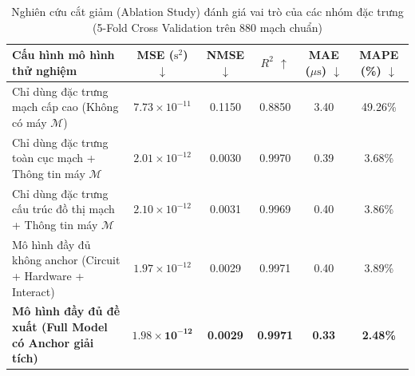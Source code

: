 \documentclass[11pt, a4paper]{article}
\begin{document}
\begin{table}[htbp]
\centering
\caption{Nghiên cứu cắt giảm (Ablation Study) đánh giá vai trò của các nhóm đặc trưng (5-Fold Cross Validation trên 880 mạch chuẩn)}
\label{tab:rq3_ablation}
\small
\begin{tabularx}{\textwidth}{X c c c c c}
\toprule
\textbf{Cấu hình mô hình thử nghiệm} & \textbf{MSE ($\text{s}^2$) $\downarrow$} & \textbf{NMSE $\downarrow$} & \textbf{$R^2$ $\uparrow$} & \textbf{MAE ($\mu\text{s}$) $\downarrow$} & \textbf{MAPE (\%) $\downarrow$} \\
\midrule
Chỉ dùng đặc trưng mạch cấp cao (Không có máy $\mathcal{M}$) & $7.73 \times 10^{-11}$ & 0.1150 & 0.8850 & 3.40 & 49.26\% \\
Chỉ dùng đặc trưng toàn cục mạch + Thông tin máy $\mathcal{M}$ & $2.01 \times 10^{-12}$ & 0.0030 & 0.9970 & 0.39 & 3.68\% \\
Chỉ dùng đặc trưng cấu trúc đồ thị mạch + Thông tin máy $\mathcal{M}$ & $2.10 \times 10^{-12}$ & 0.0031 & 0.9969 & 0.40 & 3.86\% \\
Mô hình đầy đủ không anchor (Circuit + Hardware + Interact) & $1.97 \times 10^{-12}$ & 0.0029 & 0.9971 & 0.40 & 3.89\% \\
\textbf{Mô hình đầy đủ đề xuất (Full Model có Anchor giải tích)} & $\mathbf{1.98 \times 10^{-12}}$ & \textbf{0.0029} & \textbf{0.9971} & \textbf{0.33} & \textbf{2.48\%} \\
\bottomrule
\end{tabularx}
\end{table}
\end{document}
